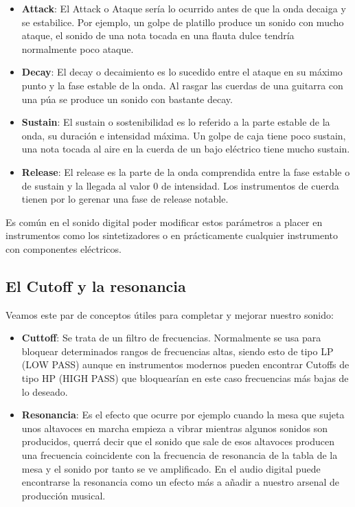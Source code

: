 \begin{itemize}
    \item \textbf{Attack}: El Attack o Ataque sería lo ocurrido antes de que la onda decaiga y se estabilice. Por ejemplo, un golpe de platillo produce un sonido con mucho ataque, el sonido de una nota tocada en una flauta dulce tendría normalmente poco ataque.
    \item \textbf{Decay}: El decay o decaimiento es lo sucedido entre el ataque en su máximo punto y la fase estable de la onda. Al rasgar las cuerdas de una guitarra con una púa se produce un sonido con bastante decay.
    \item \textbf{Sustain}: El sustain o sostenibilidad es lo referido a la parte estable de la onda, su duración e intensidad máxima. Un golpe de caja tiene poco sustain, una nota tocada al aire en la cuerda de un bajo eléctrico tiene mucho sustain.
    \item \textbf{Release}: El release es la parte de la onda comprendida entre la fase estable o de sustain y la llegada al valor 0 de intensidad. Los instrumentos de cuerda tienen por lo gerenar una fase de release notable.
\end{itemize}


Es común en el sonido digital poder modificar estos parámetros a placer en instrumentos como los sintetizadores o en prácticamente cualquier instrumento con componentes eléctricos.

\subsection{El Cutoff y la resonancia}\label{sec:Cutoff} 

Veamos este par de conceptos útiles para completar y mejorar nuestro sonido:

\begin{itemize}
    \item \textbf{Cuttoff}: Se trata de un filtro de frecuencias. Normalmente se usa para bloquear determinados rangos de frecuencias altas, siendo esto de tipo LP (LOW PASS) aunque en instrumentos modernos pueden encontrar Cutoffs de tipo HP (HIGH PASS) que bloquearían en este caso frecuencias más bajas de lo deseado.
    \item \textbf{Resonancia}: Es el efecto que ocurre por ejemplo cuando la mesa que sujeta unos altavoces en marcha empieza a vibrar mientras algunos sonidos son producidos, querrá decir que el sonido que sale de esos altavoces producen una frecuencia coincidente con la frecuencia de resonancia de la tabla de la mesa y el sonido por tanto se ve amplificado. En el audio digital puede encontrarse la resonancia como un efecto más a añadir a nuestro arsenal de producción musical. 
\end{itemize}


